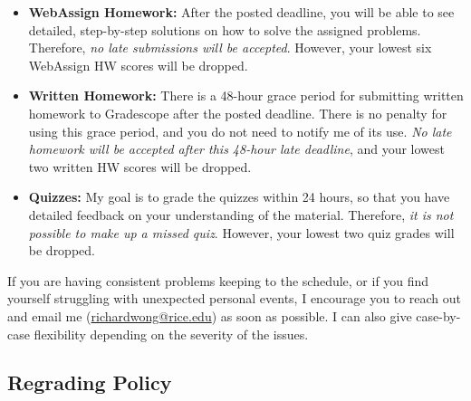 \documentclass[11pt]{article}
\begin{document}
\begin{itemize}

    \item \textbf{WebAssign Homework:} After the posted deadline, you will be able to see detailed, step-by-step solutions on how to solve the assigned problems.  Therefore, \emph{no late submissions will be accepted}.  However, your lowest six WebAssign HW scores will be dropped.
    
        \item \textbf{Written Homework:} There is a 48-hour grace period for submitting written homework to Gradescope after the posted deadline.  There is no penalty for using this grace period, and you do not need to notify me of its use.  \emph{No late homework will be accepted after this 48-hour late deadline}, and your lowest two written HW scores will be dropped.

 
    \item \textbf{Quizzes:} My goal is to grade the quizzes within 24 hours, so that you have detailed feedback on your understanding of the material.  Therefore, \emph{it is not possible to make up a missed quiz}. However, your lowest two quiz grades will be dropped.
\end{itemize}


If you are having consistent problems keeping to the schedule, or if you find yourself struggling with unexpected personal events, I encourage you to reach out and email me (\href{mailto:richardwong@rice.edu}{richardwong@rice.edu}) as soon as possible.   I can also give case-by-case flexibility depending on the severity of the issues.




\subsection*{Regrading Policy}
\end{document}
